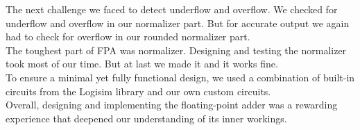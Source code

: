 \documentclass[a4paper,12pt]{article}
\begin{document}
The next challenge we faced to detect underflow and overflow. We checked for
underflow and overflow in our normalizer part. But for accurate output we again
had to check for overflow in our rounded normalizer part.\\

The toughest part of FPA was normalizer. Designing and testing the normalizer
took most of our time. But at last we made it and it works fine.\\

To ensure a minimal yet fully functional design, we used a combination of
built-in circuits from the Logisim library and our own custom circuits.\\

Overall, designing and implementing the floating-point adder was a rewarding
experience that deepened our understanding of its inner workings.
\end{document}
